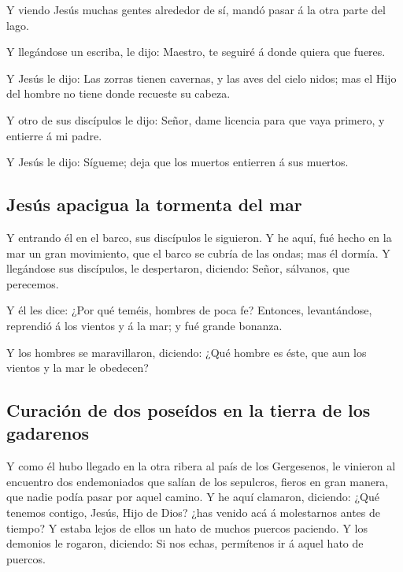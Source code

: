  Y viendo Jesús muchas gentes alrededor de sí, mandó
pasar á la otra parte del lago.

 Y llegándose un escriba, le dijo: Maestro, te seguiré á
donde quiera que fueres.

 Y Jesús le dijo: Las zorras tienen cavernas, y las aves
del cielo nidos; mas el Hijo del hombre no tiene donde recueste su
cabeza.

 Y otro de sus discípulos le dijo: Señor, dame licencia
para que vaya primero, y entierre á mi padre.

 Y Jesús le dijo: Sígueme; deja que los muertos entierren
á sus muertos.

\hypertarget{jesuxfas-apacigua-la-tormenta-del-mar}{%
\subsection{Jesús apacigua la tormenta del
mar}\label{jesuxfas-apacigua-la-tormenta-del-mar}}

 Y entrando él en el barco, sus discípulos le siguieron.
 Y he aquí, fué hecho en la mar un gran movimiento, que
el barco se cubría de las ondas; mas él dormía.  Y
llegándose sus discípulos, le despertaron, diciendo: Señor, sálvanos,
que perecemos.

 Y él les dice: ¿Por qué teméis, hombres de poca fe?
Entonces, levantándose, reprendió á los vientos y á la mar; y fué grande
bonanza.

 Y los hombres se maravillaron, diciendo: ¿Qué hombre es
éste, que aun los vientos y la mar le obedecen?

\hypertarget{curaciuxf3n-de-dos-poseuxeddos-en-la-tierra-de-los-gadarenos}{%
\subsection{Curación de dos poseídos en la tierra de los
gadarenos}\label{curaciuxf3n-de-dos-poseuxeddos-en-la-tierra-de-los-gadarenos}}

 Y como él hubo llegado en la otra ribera al país de los
Gergesenos, le vinieron al encuentro dos endemoniados que salían de los
sepulcros, fieros en gran manera, que nadie podía pasar por aquel
camino.  Y he aquí clamaron, diciendo: ¿Qué tenemos
contigo, Jesús, Hijo de Dios? ¿has venido acá á molestarnos antes de
tiempo?  Y estaba lejos de ellos un hato de muchos
puercos paciendo.  Y los demonios le rogaron, diciendo:
Si nos echas, permítenos ir á aquel hato de puercos.

